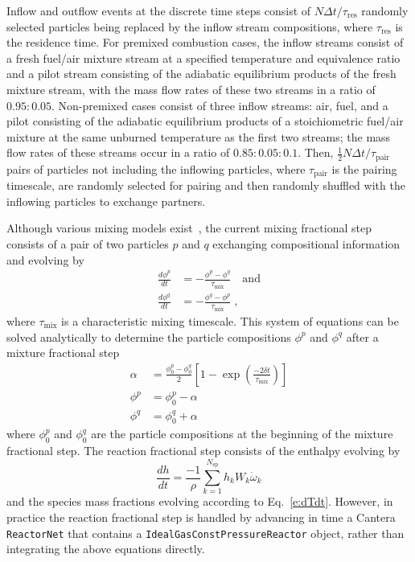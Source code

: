 \documentclass[preprint,12pt]{elsarticle}
\begin{document}
{Inflow and outflow events at the discrete time steps consist of $N \Delta t / \tau_{\text{res}}$ randomly selected particles being replaced by the inflow stream compositions, where $\tau_{\text{res}}$ is the residence time.
For premixed combustion cases, the inflow streams consist of a fresh fuel\slash air mixture stream at a specified temperature and equivalence ratio and a pilot stream consisting of the adiabatic equilibrium products of the fresh mixture stream, with the mass flow rates of these two streams in a ratio of $0.95 \mathbin{:} 0.05$.
Non-premixed cases consist of three inflow streams: air, fuel, and a pilot consisting of the adiabatic equilibrium products of a stoichiometric fuel\slash air mixture at the same unburned temperature as the first two streams; the mass flow rates of these streams occur in a ratio of $0.85 \mathbin{:} 0.05 \mathbin{:} 0.1$. 
Then, $\frac{1}{2} N \Delta t / \tau_{\text{pair}}$ pairs of particles not including the inflowing particles, where $\tau_{\text{pair}}$ is the pairing timescale, are randomly selected for pairing and then randomly shuffled with the inflowing particles to exchange partners.

Although various mixing models exist~\cite{Ren:2004fz}, the current mixing fractional step consists of a pair of two particles $p$ and $q$ exchanging compositional information and evolving by
\begin{align}
\frac{d \phi^p}{dt} &= - \frac{ \phi^p - \phi^q }{ \tau_{\text{mix}} } \quad \text{and} \\
\frac{d \phi^q}{dt} &= - \frac{ \phi^q - \phi^p }{ \tau_{\text{mix}} } \;,
\end{align}
where $\tau_{\text{mix}}$ is a characteristic mixing timescale.
This system of equations can be solved analytically to determine the particle compositions $\phi^p$ and $\phi^q$ after a mixture fractional step 
\begin{align}
\alpha &= \frac{ \phi^p_0 - \phi^q_0 }{2} \left[1 - \exp \left( \frac{-2 \delta t}{\tau_{\text{mix}}} \right) \right] \\
\phi^p &= \phi^p_0 - \alpha \\
\phi^q &= \phi^q_0 + \alpha
\end{align}
where $\phi^p_0$ and $\phi^q_0$ are the particle compositions at the beginning of the mixture fractional step.
The reaction fractional step consists of the enthalpy evolving by
\begin{equation}
\frac{dh}{dt} = \frac{-1}{\rho} \sum_{k=1}^{N_{\text{sp}}} h_k W_k \dot{\omega}_k
\end{equation}
and the species mass fractions evolving according to Eq.~\eqref{e:dTdt}.
However, in practice the reaction fractional step is handled by advancing in time a Cantera~\cite{Goodwin:2014aa} \texttt{ReactorNet} that contains a \texttt{IdealGasConstPressureReactor} object, rather than integrating the above equations directly.

}
\end{document}
